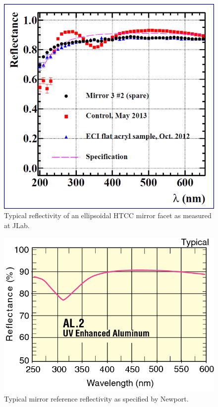 \begin{figure}[ht]
    \centering
    \includegraphics[width=1.0\linewidth]{images/JLab_Mirror_Better.png}
    \caption{Typical reflectivity of an ellipsoidal HTCC mirror facet as measured at JLab.}
    \label{fig:JLab_Mirror_Better}
\end{figure}

\begin{figure}[ht]
    \centering
    \includegraphics[width=1.0\linewidth]{images/Ref_Mirror}
    \caption{Typical mirror reference reflectivity  as specified by Newport.}
    \label{fig:Ref_Mirror}
\end{figure}
 
